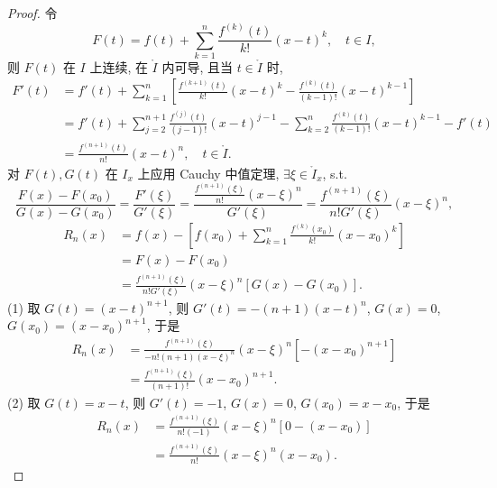 \begin{proof}
令
\[
F(t)=f(t)+\sum_{k=1}^{n}\frac{f^{(k)}(t)}{k!}(x-t)^{k},\quad t\in I,
\]
则 $F(t)$ 在 $I$ 上连续, 在 $\mathring{I}$ 内可导, 且当 $t\in\mathring{I}$ 时,
\begin{align*}
F'(t)&=f'(t)+\sum_{k=1}^{n}\left[\frac{f^{(k+1)}(t)}{k!}(x-t)^{k}-\frac{f^{(k)}(t)}{(k-1)!}(x-t)^{k-1}\right]\\
&=f'(t)+\sum_{j=2}^{n+1}\frac{f^{(j)}(t)}{(j-1)!}(x-t)^{j-1}-\sum_{k=2}^{n}\frac{f^{(k)}(t)}{(k-1)!}(x-t)^{k-1}-f'(t)\\
&=\frac{f^{(n+1)}(t)}{n!}(x-t)^{n},\quad t\in\mathring{I}.
\end{align*}
对 $F(t), G(t)$ 在 $I_{x}$ 上应用 Cauchy 中值定理, $\exists \xi\in\mathring{I}_{x}$, s.t.
\[
\frac{F(x)-F(x_{0})}{G(x)-G(x_{0})}=\frac{F'(\xi)}{G'(\xi)}=\frac{\frac{f^{(n+1)}(\xi)}{n!}(x-\xi)^{n}}{G'(\xi)}=\frac{f^{(n+1)}(\xi)}{n!G'(\xi)}(x-\xi)^{n},
\]
\begin{align*}
R_{n}(x)&=f(x)-\left[f(x_{0})+\sum_{k=1}^{n}\frac{f^{(k)}(x_{0})}{k!}(x-x_{0})^{k}\right]\\
&=F(x)-F(x_{0})\\
&=\frac{f^{(n+1)}(\xi)}{n!G'(\xi)}(x-\xi)^{n}\left[G(x)-G(x_{0})\right].
\end{align*}
(1) 取 $G(t)=(x-t)^{n+1}$, 则 $G'(t)=-(n+1)(x-t)^{n}$, $G(x)=0$, $G(x_{0})=(x-x_{0})^{n+1}$, 于是
\begin{align*}
R_{n}(x)&=\frac{f^{(n+1)}(\xi)}{-n!(n+1)(x-\xi)^{n}}(x-\xi)^{n}\left[-(x-x_{0})^{n+1}\right]\\
&=\frac{f^{(n+1)}(\xi)}{(n+1)!}(x-x_{0})^{n+1}.
\end{align*}
(2) 取 $G(t)=x-t$, 则 $G'(t)=-1$, $G(x)=0$, $G(x_{0})=x-x_{0}$, 于是
\begin{align*}
R_{n}(x)&=\frac{f^{(n+1)}(\xi)}{n!(-1)}(x-\xi)^{n}\left[0-(x-x_{0})\right]\\
&=\frac{f^{(n+1)}(\xi)}{n!}(x-\xi)^{n}(x-x_{0}).
\end{align*}
\end{proof}

